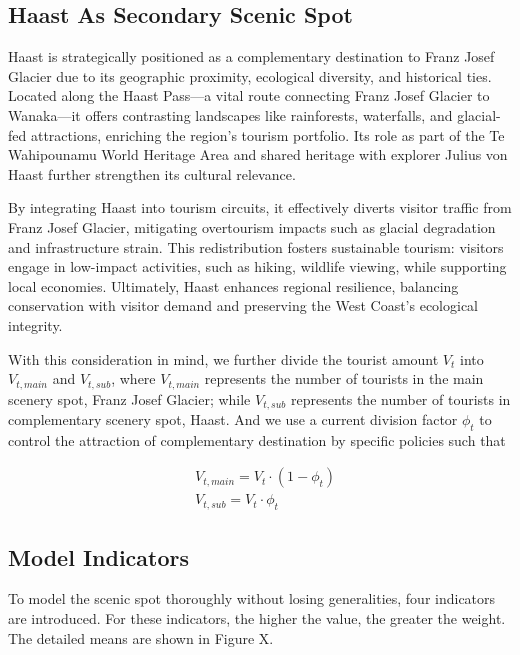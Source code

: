 \documentclass{mcmthesis}
\begin{document}
\subsection{Haast As Secondary Scenic Spot}
Haast is strategically positioned as a complementary destination to Franz Josef Glacier due to its geographic proximity, ecological diversity, and historical ties.
Located along the Haast Pass—a vital route connecting Franz Josef Glacier to Wanaka—it offers contrasting landscapes like rainforests, waterfalls, and glacial-fed attractions, enriching the region's tourism portfolio.
Its role as part of the Te Wahipounamu World Heritage Area and shared heritage with explorer Julius von Haast further strengthen its cultural relevance.

By integrating Haast into tourism circuits, it effectively diverts visitor traffic from Franz Josef Glacier, mitigating overtourism impacts such as glacial degradation and infrastructure strain.
This redistribution fosters sustainable tourism: visitors engage in low-impact activities, such as hiking, wildlife viewing, while supporting local economies. 
Ultimately, Haast enhances regional resilience, balancing conservation with visitor demand and preserving the West Coast's ecological integrity.

With this consideration in mind, we further divide the tourist amount $V_t$ into $V_{t,main}$ and $V_{t,sub}$, where $V_{t,main}$ represents the number of tourists 
in the main scenery spot, Franz Josef Glacier; while $V_{t,sub}$ represents the number of tourists in complementary scenery spot, Haast.
And we use a current division factor $\phi_t$ to control the attraction of complementary destination by specific policies such that\cite{bertsimas1998air}

\begin{align}
  & V_{t,main} = V_t \cdot (1 - \phi_t) \\
  & V_{t,sub} = V_t \cdot \phi_t
\end{align}

\subsection{Model Indicators}
To model the scenic spot thoroughly without losing generalities, four indicators are introduced.
For these indicators, the higher the value, the greater the weight. The detailed means are shown in Figure X.
\end{document}
